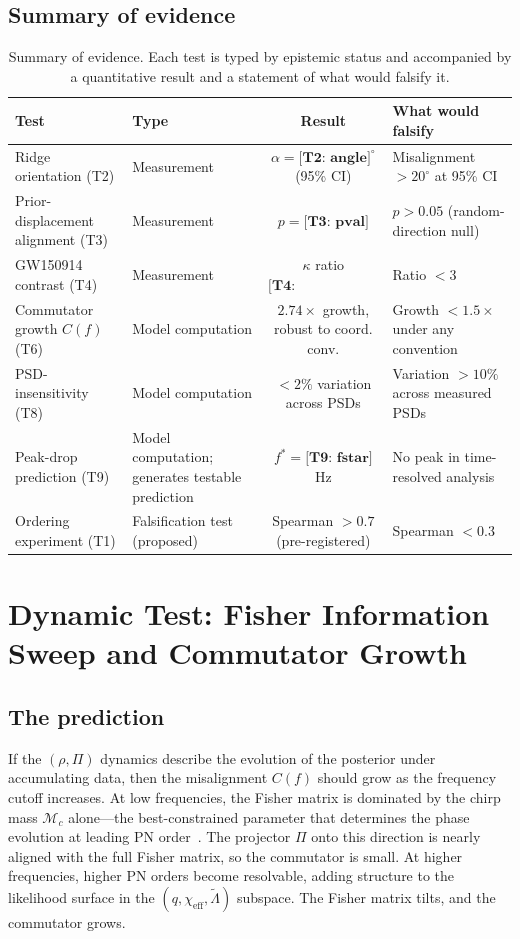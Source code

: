 \documentclass[twocolumn,prd,showpacs,superscriptaddress]{revtex4-2}
\newcommand{\Mchirp}{\mathcal{M}_c}
\newcommand{\Lambdatilde}{\tilde{\Lambda}}
\newcommand{\chieff}{\chi_{\text{eff}}}
\newcommand{\manifest}[1]{\textbf{[#1]}}
\begin{document}
\subsection{Summary of evidence}

\begin{table}[tp]
\centering
\renewcommand{\arraystretch}{1.3}
\caption{Summary of evidence. Each test is typed by epistemic status and accompanied by a quantitative result and a statement of what would falsify it.}
\label{tab:evidence}
\begin{tabularx}{\textwidth}{@{}l l c X@{}}
\toprule
Test & Type & Result & What would falsify \\
\midrule
Ridge orientation (T2) & Measurement & $\alpha = \manifest{T2: angle}^\circ$ (95\% CI) & Misalignment $>20^\circ$ at 95\% CI \\
Prior-displacement alignment (T3) & Measurement & $p = \manifest{T3: pval}$ & $p > 0.05$ (random-direction null) \\
GW150914 contrast (T4) & Measurement & $\kappa$ ratio $\manifest{T4: kappa_ratio}$ & Ratio $<3$ \\
Commutator growth $C(f)$ (T6) & Model computation & $2.74\times$ growth, robust to coord. conv. & Growth $<1.5\times$ under any convention \\
PSD-insensitivity (T8) & Model computation & $<2\%$ variation across PSDs & Variation $>10\%$ across measured PSDs \\
Peak-drop prediction (T9) & Model computation; generates testable prediction & $f^* = \manifest{T9: fstar}$ Hz & No peak in time-resolved analysis \\
Ordering experiment (T1) & Falsification test (proposed) & Spearman $>0.7$ (pre-registered) & Spearman $<0.3$ \\
\bottomrule
\end{tabularx}
\end{table}

\section{Dynamic Test: Fisher Information Sweep and Commutator Growth}
\label{sec:dynamic}

\subsection{The prediction}

If the $(\rho, \Pi)$ dynamics describe the evolution of the posterior under accumulating data, then the misalignment $C(f)$ should grow as the frequency cutoff increases. At low frequencies, the Fisher matrix is dominated by the chirp mass $\Mchirp$ alone---the best-constrained parameter that determines the phase evolution at leading PN order~\cite{poisson2014gravity}. The projector $\Pi$ onto this direction is nearly aligned with the full Fisher matrix, so the commutator is small. At higher frequencies, higher PN orders become resolvable, adding structure to the likelihood surface in the $(q, \chieff, \Lambdatilde)$ subspace. The Fisher matrix tilts, and the commutator grows.
\end{document}
